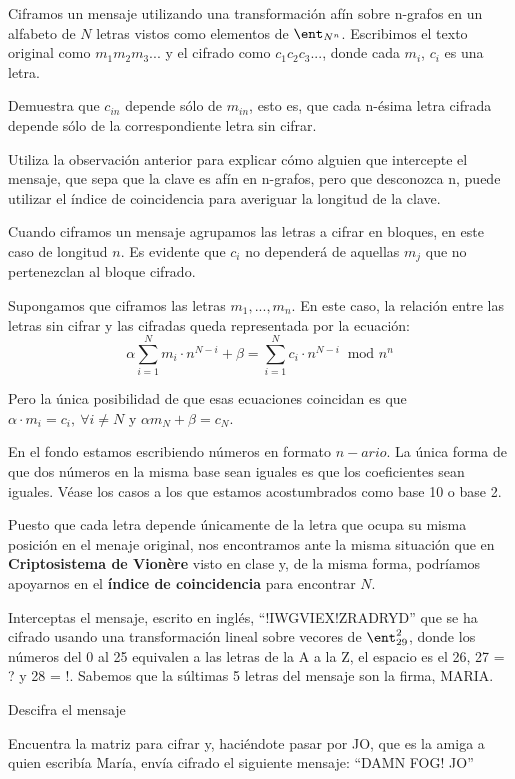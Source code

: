 \begin{problem}[2]
Ciframos un mensaje utilizando una transformación afín sobre n-grafos en un alfabeto de $N$ letras vistos como elementos de $\ent_{N^n}$. Escribimos el texto original como $m_1m_2m_3...$ y el cifrado como $c_1c_2c_3...$, donde cada $m_i$, $c_i$ es una letra.

\ppart Demuestra que $c_{in}$ depende sólo de $m_{in}$, esto es, que cada n-ésima letra cifrada depende sólo de la correspondiente letra sin cifrar.

\ppart Utiliza la observación anterior para explicar cómo alguien que intercepte el mensaje, que sepa que la clave es afín en n-grafos, pero que desconozca n, puede utilizar el índice de coincidencia para averiguar la longitud de la clave.

\solution


\spart
Cuando ciframos un mensaje agrupamos las letras a cifrar en bloques, en este caso de longitud $n$. Es evidente que $c_i$ no dependerá de aquellas $m_j$ que no pertenezclan al bloque cifrado.

Supongamos que ciframos las letras $m_1,...,m_n$. En este caso, la relación entre las letras sin cifrar y las cifradas queda representada por la ecuación:
\[α\sum_{i=1}^N m_i\cdot n^{N-i} + β= \sum_{i=1}^N c_i\cdot n^{N-i}\ \text{ mod } n^n\]

Pero la única posibilidad de que esas ecuaciones coincidan es que $α\cdot m_i=c_i, \ \forall i \neq N$ y $αm_N +β = c_N$.

\begin{remark}
En el fondo estamos escribiendo números en formato $n-ario$. La única forma de que dos números en la misma base sean iguales es que los coeficientes sean iguales. Véase los casos a los que estamos acostumbrados como base 10 o base 2.
\end{remark}

\spart
Puesto que cada letra depende únicamente de la letra que ocupa su misma posición en el menaje original, nos encontramos ante la misma situación que en \textbf{Criptosistema de Vionère} visto en clase y, de la misma forma, podríamos apoyarnos en el \textbf{índice de coincidencia} para encontrar $N$.
\end{problem}

\begin{problem}[3]
Interceptas el mensaje, escrito en inglés, ``!IWGVIEX!ZRADRYD'' que se ha cifrado usando una transformación lineal sobre vecores de $\ent_{29}^2$, donde los números del 0 al 25 equivalen a las letras de la A a la Z, el espacio es el 26, 27 = ? y 28 = !. Sabemos que la súltimas 5 letras del mensaje son la firma, MARIA.

\ppart Descifra el mensaje

\ppart Encuentra la matriz para cifrar y, haciéndote pasar por JO, que es la amiga a quien escribía María, envía cifrado el siguiente mensaje: ``DAMN FOG! JO''

\solution
\end{problem}

